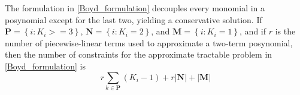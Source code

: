 The formulation in \eqref{Boyd_formulation} decouples every monomial in a posynomial except for the last two, yielding a conservative solution. If $\mathbf{P} = \left\{i:K_i >=3\right\}$, $\mathbf{N} = \left\{i:K_i = 2\right\}$, and $\mathbf{M} = \left\{i:K_i = 1\right\}$, and if $r$ is the number of piecewise-linear terms used to approximate a two-term posynomial, then the number of constraints for the approximate tractable problem in \eqref{Boyd_formulation} is $$r\textstyle{\sum}_{k \in \mathbf{P}} \left(K_i - 1\right) + r|\mathbf{N}| + |\mathbf{M}|$$
